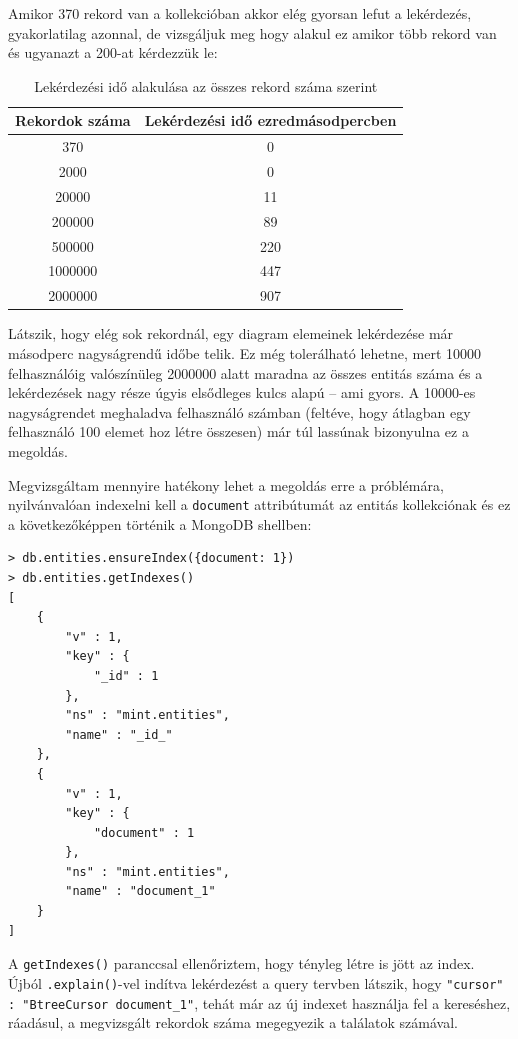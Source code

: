 Amikor 370 rekord van a kollekcióban akkor elég gyorsan lefut a lekérdezés, gyakorlatilag azonnal, de vizsgáljuk meg hogy alakul ez amikor több rekord van és ugyanazt a 200-at kérdezzük le:


\begin{table}[H]
\centering
\begin{tabular}{|c|c|}

\hline
Rekordok száma & Lekérdezési idő ezredmásodpercben \\
\hline
370 & 0 \\
2000 & 0 \\
20000 & 11 \\
200000 & 89 \\
500000 & 220 \\
1000000 & 447 \\
2000000 & 907  \\
\hline
\end{tabular}
\caption{Lekérdezési idő alakulása az összes rekord száma szerint } 
\end{table}

Látszik, hogy elég sok rekordnál, egy diagram elemeinek lekérdezése már másodperc nagyságrendű időbe telik. Ez még tolerálható lehetne, mert 10000 felhasználóig valószínüleg 2000000 alatt maradna az összes entitás száma és a lekérdezések nagy része úgyis elsődleges kulcs alapú -- ami gyors. A 10000-es nagyságrendet meghaladva felhasználó számban (feltéve, hogy átlagban egy felhasználó 100 elemet hoz létre összesen) már túl lassúnak bizonyulna ez a megoldás.

Megvizsgáltam mennyire hatékony lehet a megoldás erre a próblémára, nyilvánvalóan indexelni kell a \lstinline{document} attribútumát az entitás kollekciónak és ez a következőképpen történik a MongoDB shellben:

\begin{lstlisting}[caption=Index létrehozása]
> db.entities.ensureIndex({document: 1})
> db.entities.getIndexes()
[
    {
        "v" : 1,
        "key" : {
            "_id" : 1
        },
        "ns" : "mint.entities",
        "name" : "_id_"
    },
    {
        "v" : 1,
        "key" : {
            "document" : 1
        },
        "ns" : "mint.entities",
        "name" : "document_1"
    }
]
\end{lstlisting}

A \lstinline{getIndexes()} paranccsal ellenőriztem, hogy tényleg létre is jött az index. Újból \lstinline{.explain()}-vel indítva lekérdezést a query tervben látszik, hogy \lstinline{"cursor" : "BtreeCursor document_1"}, tehát már az új indexet használja fel a kereséshez, ráadásul, a megvizsgált rekordok száma megegyezik a találatok számával. 

